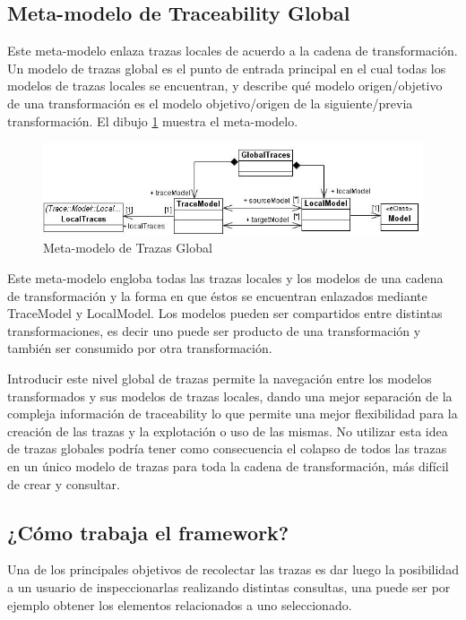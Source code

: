 \documentclass[a4paper,12pt,oneside]{book}
\begin{document}
\subsection{Meta-modelo de Traceability Global}

Este meta-modelo enlaza trazas locales de acuerdo a la cadena de transformación. Un modelo de trazas global es el punto de entrada principal en el cual todas los modelos de trazas locales se encuentran, y describe qué modelo origen/objetivo de una transformación es el modelo objetivo/origen de la siguiente/previa transformación. El dibujo \ref{fig:GlobalTraceMetamodel} muestra el meta-modelo.

\begin{figure}[hbtp]
\centering
\includegraphics[scale=.6]{./img/GlobalTraceMetamodel}
\caption{Meta-modelo de Trazas Global}
\label{fig:GlobalTraceMetamodel}
\end{figure}

Este meta-modelo engloba todas las trazas locales y los modelos de una cadena de transformación y la forma en que éstos se encuentran enlazados mediante TraceModel y LocalModel. Los modelos pueden ser compartidos entre distintas transformaciones, es decir uno puede ser producto de una transformación y también ser consumido por otra transformación.

Introducir este nivel global de trazas permite la navegación entre los modelos transformados y sus modelos de trazas locales, dando una mejor separación de la compleja información de traceability lo que permite una mejor flexibilidad para la creación de las trazas y la explotación o uso de las mismas. No utilizar esta idea de trazas globales podría tener como consecuencia el colapso de todos las trazas en un único modelo de trazas para toda la cadena de transformación, más difícil de crear y consultar.

\subsection{¿Cómo trabaja el framework?}

Una de los principales objetivos de recolectar las trazas es dar luego la posibilidad a un usuario de inspeccionarlas realizando distintas consultas, una puede ser por ejemplo obtener los elementos relacionados a uno seleccionado.
\end{document}

